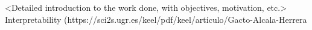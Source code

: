 %
%
%

<Detailed introduction to the work done, with objectives, motivation, etc.>
Interpretability (https://sci2s.ugr.es/keel/pdf/keel/articulo/Gacto-Alcala-Herrera%

